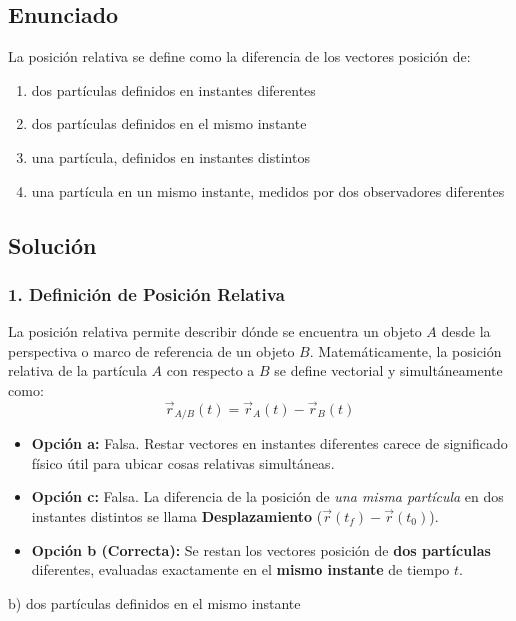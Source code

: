 \documentclass[12pt, a4paper]{article}
\begin{document}

\subsection*{Enunciado}
La posición relativa se define como la diferencia de los vectores posición de:
\begin{enumerate}[label=\alph*)]
    \item dos partículas definidos en instantes diferentes
    \item dos partículas definidos en el mismo instante
    \item una partícula, definidos en instantes distintos
    \item una partícula en un mismo instante, medidos por dos observadores diferentes
\end{enumerate}

\subsection*{Solución}

\subsubsection*{1. Definición de Posición Relativa}
La posición relativa permite describir dónde se encuentra un objeto $A$ desde la perspectiva o marco de referencia de un objeto $B$.
Matemáticamente, la posición relativa de la partícula $A$ con respecto a $B$ se define vectorial y simultáneamente como:
$$ \vec{r}_{A/B}(t) = \vec{r}_A(t) - \vec{r}_B(t) $$

\begin{itemize}
    \item \textbf{Opción a:} Falsa. Restar vectores en instantes diferentes carece de significado físico útil para ubicar cosas relativas simultáneas.
    \item \textbf{Opción c:} Falsa. La diferencia de la posición de \textit{una misma partícula} en dos instantes distintos se llama \textbf{Desplazamiento} ($\vec{r}(t_f) - \vec{r}(t_0)$).
    \item \textbf{Opción b (Correcta):} Se restan los vectores posición de \textbf{dos partículas} diferentes, evaluadas exactamente en el \textbf{mismo instante} de tiempo $t$.
\end{itemize}

\begin{tcolorbox}[colback=green!5!white, colframe=green!50!black, title=Respuesta Final]
\centering \Large b) dos partículas definidos en el mismo instante
\end{tcolorbox}
\end{document}
